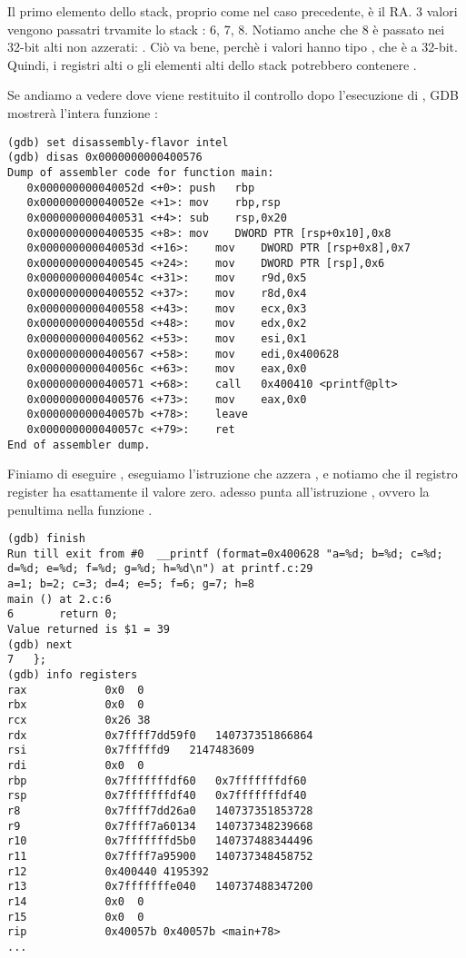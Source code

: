 Il primo elemento dello stack, proprio come nel caso precedente, è il {RA}.
3 valori vengono passatri trvamite lo stack : 6, 7, 8.
Notiamo anche che 8 è passato nei 32-bit alti non azzerati: .
Ciò va bene, perchè i valori hanno tipo \Tint , che è a 32-bit.
Quindi, i registri alti o gli elementi alti dello stack potrebbero contenere .

Se andiamo a vedere dove viene restituito il controllo dopo l'esecuzione di \printf, 
\ac{GDB} mostrerà l'intera funzione \main:

\begin{lstlisting}[style=customasmx86]
(gdb) set disassembly-flavor intel
(gdb) disas 0x0000000000400576
Dump of assembler code for function main:
   0x000000000040052d <+0>:	push   rbp
   0x000000000040052e <+1>:	mov    rbp,rsp
   0x0000000000400531 <+4>:	sub    rsp,0x20
   0x0000000000400535 <+8>:	mov    DWORD PTR [rsp+0x10],0x8
   0x000000000040053d <+16>:	mov    DWORD PTR [rsp+0x8],0x7
   0x0000000000400545 <+24>:	mov    DWORD PTR [rsp],0x6
   0x000000000040054c <+31>:	mov    r9d,0x5
   0x0000000000400552 <+37>:	mov    r8d,0x4
   0x0000000000400558 <+43>:	mov    ecx,0x3
   0x000000000040055d <+48>:	mov    edx,0x2
   0x0000000000400562 <+53>:	mov    esi,0x1
   0x0000000000400567 <+58>:	mov    edi,0x400628
   0x000000000040056c <+63>:	mov    eax,0x0
   0x0000000000400571 <+68>:	call   0x400410 <printf@plt>
   0x0000000000400576 <+73>:	mov    eax,0x0
   0x000000000040057b <+78>:	leave  
   0x000000000040057c <+79>:	ret    
End of assembler dump.
\end{lstlisting}

Finiamo di eseguire \printf, eseguiamo l'istruzione che azzera \EAX, e notiamo che il registro \EAX register ha esattamente il valore zero.
\RIP adesso punta all'istruzione  , ovvero la penultima nella funzione \main.

\begin{lstlisting}
(gdb) finish
Run till exit from #0  __printf (format=0x400628 "a=%d; b=%d; c=%d; d=%d; e=%d; f=%d; g=%d; h=%d\n") at printf.c:29
a=1; b=2; c=3; d=4; e=5; f=6; g=7; h=8
main () at 2.c:6
6		return 0;
Value returned is $1 = 39
(gdb) next
7	};
(gdb) info registers
rax            0x0	0
rbx            0x0	0
rcx            0x26	38
rdx            0x7ffff7dd59f0	140737351866864
rsi            0x7fffffd9	2147483609
rdi            0x0	0
rbp            0x7fffffffdf60	0x7fffffffdf60
rsp            0x7fffffffdf40	0x7fffffffdf40
r8             0x7ffff7dd26a0	140737351853728
r9             0x7ffff7a60134	140737348239668
r10            0x7fffffffd5b0	140737488344496
r11            0x7ffff7a95900	140737348458752
r12            0x400440	4195392
r13            0x7fffffffe040	140737488347200
r14            0x0	0
r15            0x0	0
rip            0x40057b	0x40057b <main+78>
...
\end{lstlisting}
